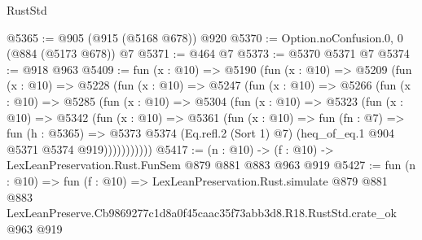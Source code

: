 \begin{lexlean}{RustStd}
\begin{coremodule}
@5365 := @905 (@915 (@5168 @678)) @920
@5370 := Option.noConfusion.{0, 0} (@884 (@5173 @678)) @7
@5371 := @464 @7
@5373 := @5370 @5371 @7
@5374 := @918 @963
@5409 := fun (x : @10) =>
  @5190
    (fun (x : @10) =>
    @5209
      (fun (x : @10) =>
      @5228
        (fun (x : @10) =>
        @5247
          (fun (x : @10) =>
          @5266
            (fun (x : @10) =>
            @5285
              (fun (x : @10) =>
              @5304
                (fun (x : @10) =>
                @5323
                  (fun (x : @10) =>
                  @5342
                    (fun (x : @10) =>
                    @5361
                      (fun (x : @10) =>
                      fun (fn : @7) =>
                      fun (h : @5365) =>
                      @5373
                        @5374
                        (Eq.refl.{2} (Sort 1) @7)
                        (heq_of_eq.{1} @904 @5371 @5374 @919)))))))))))
@5417 := (n : @10) -> (f : @10) -> LexLeanPreservation.Rust.FunSem @879 @881 @883 @963 @919
@5427 := fun (n : @10) =>
  fun (f : @10) =>
  LexLeanPreservation.Rust.simulate
    @879
    @881
    @883
    LexLeanPreserve.Cb9869277c1d8a0f45caac35f73abb3d8.R18.RustStd.crate_ok
    @963
    @919
\end{coremodule}
\end{lexlean}
